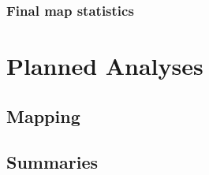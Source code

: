 \documentclass[
]{article}
\begin{document}
\hypertarget{final-map-statistics}{%
\subsubsection{Final map statistics}\label{final-map-statistics}}

\hypertarget{planned-analyses}{%
\section{Planned Analyses}\label{planned-analyses}}

\hypertarget{mapping}{%
\subsection{Mapping}\label{mapping}}

\hypertarget{summaries}{%
\subsection{Summaries}\label{summaries}}
\end{document}
